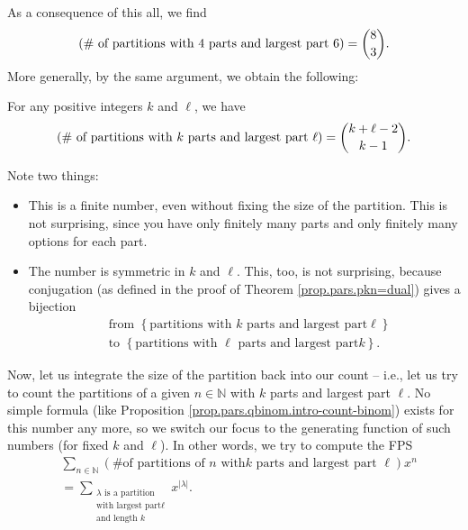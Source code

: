 As a consequence of this all, we find%
\[
\left(  \text{\# of partitions with }4\text{ parts and largest part }6\right)
=\dbinom{8}{3}.
\]
More generally, by the same argument, we obtain the following:

\begin{proposition}
\label{prop.pars.qbinom.intro-count-binom}For any positive integers $k$ and
$\ell$, we have%
\[
\left(  \text{\# of partitions with }k\text{ parts and largest part }%
\ell\right)  =\dbinom{k+\ell-2}{k-1}.
\]

\end{proposition}

Note two things:

\begin{itemize}
\item This is a finite number, even without fixing the size of the partition.
This is not surprising, since you have only finitely many parts and only
finitely many options for each part.

\item The number is symmetric in $k$ and $\ell$. This, too, is not surprising,
because conjugation (as defined in the proof of Theorem
\ref{prop.pars.pkn=dual}) gives a bijection%
\begin{align*}
&  \text{from }\left\{  \text{partitions with }k\text{ parts and largest part
}\ell\right\} \\
&  \text{to }\left\{  \text{partitions with }\ell\text{ parts and largest part
}k\right\}  .
\end{align*}

\end{itemize}

Now, let us integrate the size of the partition back into our count -- i.e.,
let us try to count the partitions of a given $n\in\mathbb{N}$ with $k$ parts
and largest part $\ell$. No simple formula (like Proposition
\ref{prop.pars.qbinom.intro-count-binom}) exists for this number any more, so
we switch our focus to the generating function of such numbers (for fixed $k$
and $\ell$). In other words, we try to compute the FPS%
\begin{align*}
&  \sum_{n\in\mathbb{N}}\left(  \text{\# of partitions of }n\text{ with
}k\text{ parts and largest part }\ell\right)  x^{n}\\
&  =\sum_{\substack{\lambda\text{ is a partition}\\\text{with largest part
}\ell\\\text{and length }k}}x^{\left\vert \lambda\right\vert }.
\end{align*}


